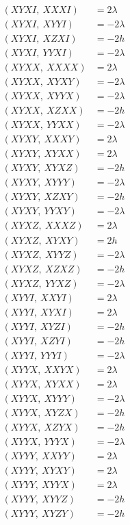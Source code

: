 \documentclass{article}
\begin{document}
\begin{align*}
  (XYXI,\ XXXI) &= 2 \lambda \\
  (XYXI,\ XYYI) &= - 2 \lambda \\
  (XYXI,\ XZXI) &= - 2 h \\
  (XYXI,\ YYXI) &= - 2 \lambda \\
  (XYXX,\ XXXX) &= 2 \lambda \\
  (XYXX,\ XYXY) &= - 2 \lambda \\
  (XYXX,\ XYYX) &= - 2 \lambda \\
  (XYXX,\ XZXX) &= - 2 h \\
  (XYXX,\ YYXX) &= - 2 \lambda \\
  (XYXY,\ XXXY) &= 2 \lambda \\
  (XYXY,\ XYXX) &= 2 \lambda \\
  (XYXY,\ XYXZ) &= - 2 h \\
  (XYXY,\ XYYY) &= - 2 \lambda \\
  (XYXY,\ XZXY) &= - 2 h \\
  (XYXY,\ YYXY) &= - 2 \lambda \\
  (XYXZ,\ XXXZ) &= 2 \lambda \\
  (XYXZ,\ XYXY) &= 2 h \\
  (XYXZ,\ XYYZ) &= - 2 \lambda \\
  (XYXZ,\ XZXZ) &= - 2 h \\
  (XYXZ,\ YYXZ) &= - 2 \lambda \\
  (XYYI,\ XXYI) &= 2 \lambda \\
  (XYYI,\ XYXI) &= 2 \lambda \\
  (XYYI,\ XYZI) &= - 2 h \\
  (XYYI,\ XZYI) &= - 2 h \\
  (XYYI,\ YYYI) &= - 2 \lambda \\
  (XYYX,\ XXYX) &= 2 \lambda \\
  (XYYX,\ XYXX) &= 2 \lambda \\
  (XYYX,\ XYYY) &= - 2 \lambda \\
  (XYYX,\ XYZX) &= - 2 h \\
  (XYYX,\ XZYX) &= - 2 h \\
  (XYYX,\ YYYX) &= - 2 \lambda \\
  (XYYY,\ XXYY) &= 2 \lambda \\
  (XYYY,\ XYXY) &= 2 \lambda \\
  (XYYY,\ XYYX) &= 2 \lambda \\
  (XYYY,\ XYYZ) &= - 2 h \\
  (XYYY,\ XYZY) &= - 2 h \\

\end{align*}
\end{document}
